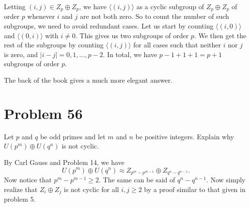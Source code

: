 \documentclass[12pt]{article}
\begin{document}
Letting $(i,j)\in Z_p\oplus Z_p$, we have $\langle (i,j)\rangle$ as a cyclic
subgroup of $Z_p\oplus Z_p$ of order $p$
whenever $i$ and $j$ are not both zero.  So to count the number of such
subgroups, we need to avoid redundant cases.
Let us start by counting $\langle (i,0)\rangle$ and $\langle (0,i)\rangle$ with
$i\neq 0$.  This gives us two subgroups of order $p$.
We then get the rest of the subgroups by counting $\langle (i,j)\rangle$
for all cases such that neither $i$ nor $j$ is zero, and $|i-j|=0,1,\dots,p-2$.
In total, we have $p-1+1+1=p+1$ subgroups of order $p$.

The back of the book gives a much more elegant answer.

\section*{Problem 56}

Let $p$ and $q$ be odd primes and let $m$ and $n$ be positive integers.
Explain why $U(p^m)\oplus U(q^n)$ is not cyclic.

By Carl Gauss and Problem 14, we have
\begin{equation*}
U(p^m)\oplus U(q^n)\approx Z_{p^m-p^{m-1}}\oplus Z_{q^n-q^{n-1}}.
\end{equation*}
Now notice that $p^m-p^{m-1}\geq 2$.  The same can be said of
$q^n-q^{n-1}$.  Now simply realize that $Z_i\oplus Z_j$ is
not cyclic for all $i,j\geq 2$ by a proof similar to that
given in problem 5.
\end{document}
